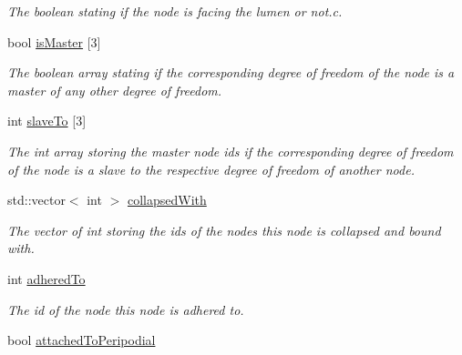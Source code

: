 \begin{DoxyCompactItemize}
\begin{DoxyCompactList}\small\item\em The boolean stating if the node is facing the lumen or not.\+c. \end{DoxyCompactList}\item 
\hypertarget{classNode_af96140b8fa2e7abffd79a040c6972309}{}bool \hyperlink{classNode_af96140b8fa2e7abffd79a040c6972309}{is\+Master} \mbox{[}3\mbox{]}\label{classNode_af96140b8fa2e7abffd79a040c6972309}

\begin{DoxyCompactList}\small\item\em The boolean array stating if the corresponding degree of freedom of the node is a master of any other degree of freedom. \end{DoxyCompactList}\item 
\hypertarget{classNode_a83aeb69143ee2ddc1f6f49be4b261b44}{}int \hyperlink{classNode_a83aeb69143ee2ddc1f6f49be4b261b44}{slave\+To} \mbox{[}3\mbox{]}\label{classNode_a83aeb69143ee2ddc1f6f49be4b261b44}

\begin{DoxyCompactList}\small\item\em The int array storing the master node ids if the corresponding degree of freedom of the node is a slave to the respective degree of freedom of another node. \end{DoxyCompactList}\item 
\hypertarget{classNode_a099baa33319712e8ff03063385f8e095}{}std\+::vector$<$ int $>$ \hyperlink{classNode_a099baa33319712e8ff03063385f8e095}{collapsed\+With}\label{classNode_a099baa33319712e8ff03063385f8e095}

\begin{DoxyCompactList}\small\item\em The vector of int storing the ids of the nodes this node is collapsed and bound with. \end{DoxyCompactList}\item 
\hypertarget{classNode_a484ea8b4f71ea5fdfa1036ed1fabfae0}{}int \hyperlink{classNode_a484ea8b4f71ea5fdfa1036ed1fabfae0}{adhered\+To}\label{classNode_a484ea8b4f71ea5fdfa1036ed1fabfae0}

\begin{DoxyCompactList}\small\item\em The id of the node this node is adhered to. \end{DoxyCompactList}\item 
\hypertarget{classNode_a62f609723e0516ff02232727575b0a15}{}bool \hyperlink{classNode_a62f609723e0516ff02232727575b0a15}{attached\+To\+Peripodial}\label{classNode_a62f609723e0516ff02232727575b0a15}


\end{DoxyCompactItemize}
